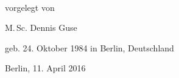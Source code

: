 \begin{titlepage}
    \begin{addmargin}[-1cm]{-3cm}
    \begin{center}
        \large  

        \hfill

        \vfill

        \begingroup
            \color{Maroon}\spacedallcaps{\myTitle} \\ \bigskip
        \endgroup

				\vspace{0.7cm}	
				vorgelegt von
				
				\vspace{0.7cm}	
				M.\,Sc. Dennis Guse
				
				geb. 24. Oktober 1984 in Berlin, Deutschland



%				
%				
%
%				
%
%				
%			



				\vspace{1cm}
				Berlin, 11. April 2016

				\vspace{0.7cm}	
				\myVersion				
%
%
%


\end{center}
\end{addmargin}
\end{titlepage}
